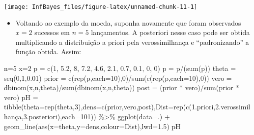 \documentclass[
]{book}
\newenvironment{Shaded}{\begin{snugshade}}{\end{snugshade}}
\newcommand{\AttributeTok}[1]{\textcolor[rgb]{0.77,0.63,0.00}{#1}}
\newcommand{\DecValTok}[1]{\textcolor[rgb]{0.00,0.00,0.81}{#1}}
\newcommand{\FloatTok}[1]{\textcolor[rgb]{0.00,0.00,0.81}{#1}}
\newcommand{\FunctionTok}[1]{\textcolor[rgb]{0.00,0.00,0.00}{#1}}
\newcommand{\NormalTok}[1]{#1}
\newcommand{\OtherTok}[1]{\textcolor[rgb]{0.56,0.35,0.01}{#1}}
\newcommand{\SpecialCharTok}[1]{\textcolor[rgb]{0.00,0.00,0.00}{#1}}
\newcommand{\StringTok}[1]{\textcolor[rgb]{0.31,0.60,0.02}{#1}}
\providecommand{\tightlist}{%
  \setlength{\itemsep}{0pt}\setlength{\parskip}{0pt}}
\begin{document}
\begin{center}\texttt{[image: InfBayes\_files/figure-latex/unnamed-chunk-11-1]} \end{center}

\begin{itemize}
\tightlist
\item
  Voltando ao exemplo da moeda, suponha novamente que foram observados \(x=2\) sucessos em \(n=5\) lançamentos. A posteriori nesse caso pode ser obtida multiplicando a distribuição a priori pela verossimilhança e ``padronizando'' a função obtida. Assim:
\end{itemize}

\begin{Shaded}
\begin{Highlighting}[]
\NormalTok{n}\OtherTok{=}\DecValTok{5}
\NormalTok{x}\OtherTok{=}\DecValTok{2}
\NormalTok{p }\OtherTok{=} \FunctionTok{c}\NormalTok{(}\DecValTok{1}\NormalTok{, }\FloatTok{5.2}\NormalTok{, }\DecValTok{8}\NormalTok{, }\FloatTok{7.2}\NormalTok{, }\FloatTok{4.6}\NormalTok{, }\FloatTok{2.1}\NormalTok{, }\FloatTok{0.7}\NormalTok{, }\FloatTok{0.1}\NormalTok{, }\DecValTok{0}\NormalTok{, }\DecValTok{0}\NormalTok{)}
\NormalTok{p }\OtherTok{=}\NormalTok{ p}\SpecialCharTok{/}\NormalTok{(}\FunctionTok{sum}\NormalTok{(p))}
\NormalTok{theta }\OtherTok{=} \FunctionTok{seq}\NormalTok{(}\DecValTok{0}\NormalTok{,}\DecValTok{1}\NormalTok{,}\FloatTok{0.01}\NormalTok{)}
\NormalTok{prior }\OtherTok{=} \FunctionTok{c}\NormalTok{(}\FunctionTok{rep}\NormalTok{(p,}\AttributeTok{each=}\DecValTok{10}\NormalTok{),}\DecValTok{0}\NormalTok{)}\SpecialCharTok{/}\FunctionTok{sum}\NormalTok{(}\FunctionTok{c}\NormalTok{(}\FunctionTok{rep}\NormalTok{(p,}\AttributeTok{each=}\DecValTok{10}\NormalTok{),}\DecValTok{0}\NormalTok{))}
\NormalTok{vero }\OtherTok{=} \FunctionTok{dbinom}\NormalTok{(x,n,theta)}\SpecialCharTok{/}\FunctionTok{sum}\NormalTok{(}\FunctionTok{dbinom}\NormalTok{(x,n,theta))}
\NormalTok{post }\OtherTok{=}\NormalTok{ (prior }\SpecialCharTok{*}\NormalTok{ vero)}\SpecialCharTok{/}\FunctionTok{sum}\NormalTok{(prior }\SpecialCharTok{*}\NormalTok{ vero)}
\NormalTok{pH }\OtherTok{=} \FunctionTok{tibble}\NormalTok{(}\AttributeTok{theta=}\FunctionTok{rep}\NormalTok{(theta,}\DecValTok{3}\NormalTok{),}\AttributeTok{dens=}\FunctionTok{c}\NormalTok{(prior,vero,post),}\AttributeTok{Dist=}\FunctionTok{rep}\NormalTok{(}\FunctionTok{c}\NormalTok{(}\StringTok{\textquotesingle{}1.priori\textquotesingle{}}\NormalTok{,}\StringTok{\textquotesingle{}2.verossimilhança\textquotesingle{}}\NormalTok{,}\StringTok{\textquotesingle{}3.posteriori\textquotesingle{}}\NormalTok{),}\AttributeTok{each=}\DecValTok{101}\NormalTok{)) }\SpecialCharTok{\%\textgreater{}\%} 
  \FunctionTok{ggplot}\NormalTok{(}\AttributeTok{data=}\NormalTok{.) }\SpecialCharTok{+}
  \FunctionTok{geom\_line}\NormalTok{(}\FunctionTok{aes}\NormalTok{(}\AttributeTok{x=}\NormalTok{theta,}\AttributeTok{y=}\NormalTok{dens,}\AttributeTok{colour=}\NormalTok{Dist),}\AttributeTok{lwd=}\FloatTok{1.5}\NormalTok{)}
\NormalTok{pH}
\end{Highlighting}
\end{Shaded}
\end{document}
